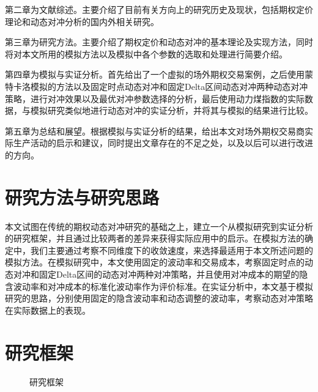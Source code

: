 第二章为文献综述。主要介绍了目前有关方向上的研究历史及现状，包括期权定价理论和动态对冲分析的国内外相关研究。

第三章为研究方法。主要介绍了期权定价和动态对冲的基本理论及实现方法，同时将对本文所用的模拟方法以及模拟中各个参数的选取和处理进行简要介绍。

第四章为模拟与实证分析。首先给出了一个虚拟的场外期权交易案例，之后使用蒙特卡洛模拟的方法以及固定时点动态对冲和固定Delta区间动态对冲两种动态对冲策略，进行对冲效果以及最优对冲参数选择的分析，最后使用动力煤指数的实际数据，与模拟研究类似地进行动态对冲的实证分析，并将其与模拟的结果进行比较。

第五章为总结和展望。根据模拟与实证分析的结果，给出本文对场外期权交易商实际生产活动的启示和建议，同时提出文章存在的不足之处，以及以后可以进行改进的方向。

\section{研究方法与研究思路}

本文试图在传统的期权动态对冲研究的基础之上，建立一个从模拟研究到实证分析的研究框架，并且通过比较两者的差异来获得实际应用中的启示。在模拟方法的确定中，我们主要通过考察不同维度下的收敛速度，来选择最适用于本文所述问题的模拟方法。在模拟研究中，本文使用固定的波动率和交易成本，考察固定时点的动态对冲和固定Delta区间的动态对冲两种对冲策略，并且使用对冲成本的期望的隐含波动率和对冲成本的标准化波动率作为评价标准。在实证分析中，本文基于模拟研究的思路，分别使用固定的隐含波动率和动态调整的波动率，考察动态对冲策略在实际数据上的表现。

\newpage
\section{研究框架}

\begin{figure}[!htp]
    \centering
    \resizebox{6cm}{!}{}
    \caption{研究框架}
    \label{fig:flow_chart}
\end{figure}
